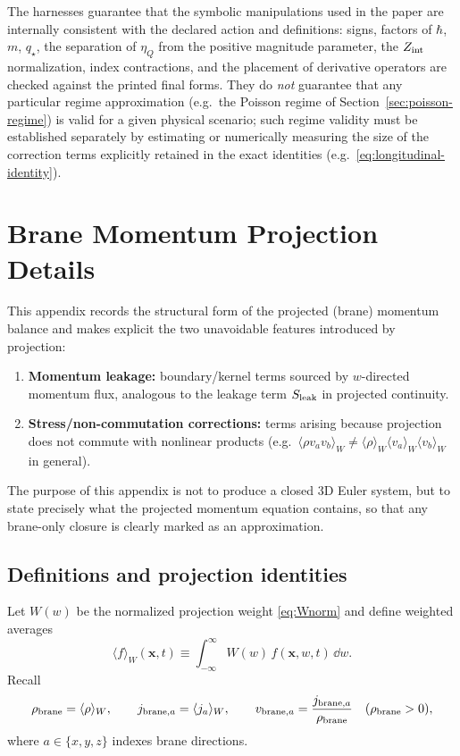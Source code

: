 \documentclass[11pt]{article}
\newcommand{\etaQ}{\eta_Q}
\newcommand{\qstar}{q_\star}
\newcommand{\Zint}{Z_{\rm int}}
\begin{document}
The harnesses guarantee that the symbolic manipulations used in the paper are internally consistent with the declared action and definitions: signs, factors of $\hbar$, $m$, $\qstar$, the separation of $\etaQ$ from the positive magnitude parameter, the $\Zint$ normalization, index contractions, and the placement of derivative operators are checked against the printed final forms. They do \emph{not} guarantee that any particular regime approximation (e.g.\ the Poisson regime of Section~\ref{sec:poisson-regime}) is valid for a given physical scenario; such regime validity must be established separately by estimating or numerically measuring the size of the correction terms explicitly retained in the exact identities (e.g.\ \eqref{eq:longitudinal-identity}).

\section{Brane Momentum Projection Details}
\label{app:momentum}

This appendix records the structural form of the projected (brane) momentum balance and makes explicit the two unavoidable features introduced by projection:
\begin{enumerate}[leftmargin=2.2em]
\item \textbf{Momentum leakage:} boundary/kernel terms sourced by $w$-directed momentum flux, analogous to the leakage term $S_{\rm leak}$ in projected continuity.
\item \textbf{Stress/non-commutation corrections:} terms arising because projection does not commute with nonlinear products (e.g.\ $\langle \rho v_a v_b\rangle_W \neq \langle\rho\rangle_W \langle v_a\rangle_W \langle v_b\rangle_W$ in general).
\end{enumerate}
The purpose of this appendix is not to produce a closed 3D Euler system, but to state precisely what the projected momentum equation contains, so that any brane-only closure is clearly marked as an approximation.

\subsection{Definitions and projection identities}
\label{app:momentum-defs}

Let $W(w)$ be the normalized projection weight \eqref{eq:Wnorm} and define weighted averages
\begin{equation}
\langle f\rangle_W(\mathbf{x},t)\equiv \int_{-\infty}^{\infty}W(w)\,f(\mathbf{x},w,t)\,\dd w.
\end{equation}
Recall
\begin{equation}
\rho_{\rm brane}=\langle \rho\rangle_W,
\qquad
j_{{\rm brane},a}=\langle j_a\rangle_W,
\qquad
v_{{\rm brane},a} = \frac{j_{{\rm brane},a}}{\rho_{\rm brane}}
\quad (\rho_{\rm brane}>0),
\end{equation}
where $a\in\{x,y,z\}$ indexes brane directions.
\end{document}
